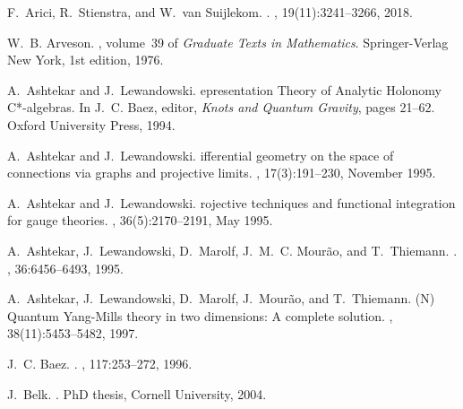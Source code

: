 \documentclass[a4paper,12pt]{amsart}
\numberwithin{equation}{section}
\theoremstyle{definition}
\begin{document}
\begin{thebibliography}{}

F.~Arici, R.~Stienstra, and W.~van Suijlekom.
.
, 19(11):3241--3266, 2018.

W.~B. Arveson.
, volume~39 of {\em Graduate
  Texts in Mathematics}.
\newblock Springer-Verlag New York, 1st edition, 1976.

A.~{A}shtekar and J.~{L}ewandowski.
epresentation {T}heory of {A}nalytic {H}olonomy {C}*-algebras.
\newblock In J.~C. {B}aez, editor, {\em {Knots and Quantum Gravity}}, pages
  21--62. {O}xford {U}niversity {P}ress, 1994.

A.~{A}shtekar and J.~{L}ewandowski.
ifferential geometry on the space of connections via graphs and
  projective limits.
, 17(3):191--230, November
  1995.

A.~{A}shtekar and J.~{L}ewandowski.
rojective techniques and functional integration for gauge
  theories.
, 36(5):2170--2191, May
  1995.

A.~{A}shtekar, J.~{L}ewandowski, D.~{M}arolf, J.~M.~C. {M}our{\~a}o, and
  T.~{T}hiemann.
.
, 36:6456--6493, 1995.

A.~{A}shtekar, J.~{L}ewandowski, D.~{M}arolf, J.~{M}our{\~a}o, and
  T.~{T}hiemann.
({N}) {Q}uantum {Y}ang-{M}ills theory in two dimensions: {A}
  complete solution.
, 38(11):5453--5482, 1997.

J.~C. Baez.
.
, 117:253--272, 1996.

J.~Belk.
.
\newblock PhD thesis, Cornell University, 2004.


\end{thebibliography}
\end{document}
